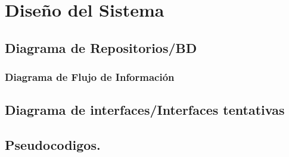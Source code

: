 \section{Diseño del Sistema}

\subsection{Diagrama de Repositorios/BD}
\subsubsection{Diagrama de Flujo de Información}

\subsection{Diagrama de interfaces/Interfaces tentativas}

\subsection{Pseudocodigos.}
